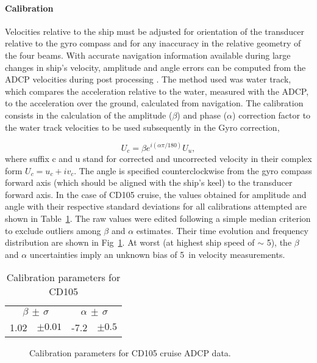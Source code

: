 \paragraph{Calibration}\label{sec:springcal} Velocities relative to the ship must be adjusted
for orientation of the transducer relative to the gyro compass and
for any inaccuracy in the relative geometry of the four beams.
With accurate navigation information available during large
changes in ship's velocity, amplitude and angle errors can be
computed from the ADCP velocities during post processing
\cite{pollard89}. The method used was water track, which compares
the acceleration relative to the water, measured with the ADCP, to
the acceleration over the ground, calculated from navigation. The
calibration consists in the calculation of the amplitude ($\beta$)
and phase ($\alpha$) correction factor to the water track
velocities to be used subsequently in the Gyro correction,

\begin{equation}\label{eq:watertrack}
  U_c=\beta e^{i(\alpha \pi/180)}U_u,
\end{equation}
where suffix c and u stand for corrected and uncorrected velocity
in their complex form $U_c=u_c+iv_c$. The angle is specified
counterclockwise from the gyro compass forward axis (which should
be aligned with the ship's keel) to the transducer forward axis.
In the case of CD105 cruise, the values obtained for amplitude and
angle with their respective standard deviations for all
calibrations attempted are shown in Table~\ref{tb:cd105cal}. The
raw values were edited following a simple median criterion to
exclude outliers among $\beta$ and $\alpha$ estimates. Their time
evolution and frequency distribution are shown in
Fig~\ref{fig:cd105cal}. At worst (at highest ship speed of $\sim$
5\vel), the $\beta$ and $\alpha$ uncertainties imply an unknown
bias of 5\velc\, in velocity measurements.
\begin{table}[h]
  \centering
\begin{tabular}{llll}
\hline \hline
\multicolumn{2}{c}{$\beta \, \pm \, \sigma$} &
\multicolumn{2}{c}{$\alpha \, \pm \, \sigma$} \\ \cline{1-4}
1.02 & $\pm 0.01$ & -7.2 & $\pm 0.5 $\\
\hline \hline
\end{tabular}
  \caption{Calibration parameters for CD105}\label{tb:cd105cal}
\end{table}
\begin{figure}[t]
\begin{center}
\caption{Calibration parameters for CD105 cruise ADCP data.}
\label{fig:cd105cal}
\end{center}
\end{figure}


